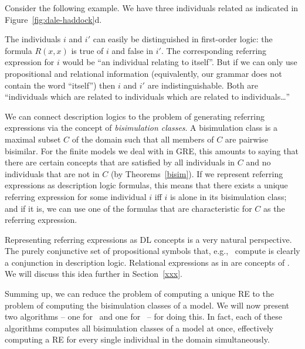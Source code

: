 Consider the following example.  We have three individuals related as indicated in
Figure~\ref{fig:dale-haddock}d.

%
The individuals $i$ and $i'$ can easily be distinguished in first-order logic:
the formula $R(x,x)$ is true of $i$ and false in $i'$. The corresponding
referring expression for $i$ would be ``an individual relating to itself''.
But if we can only use propositional and relational information (equivalently, our grammar does not contain the word ``itself'') then $i$ and $i'$ are indistinguishable. Both
are ``individuals which are related to individuals which are related to individuals\ldots''

We can connect description logics to the problem of generating
referring expressions via the concept of \emph{bisimulation classes}.
A bisimulation class is a maximal subset $C$ of the domain such that
all members of $C$ are pairwise bisimilar.  For the finite models we
deal with in GRE, this amounts to saying that there are certain
concepts that are satisfied by all individuals in $C$ and no
individuals that are not in $C$ (by Theorems~\ref{bisim}).  If we represent referring expressions as description logic formulas,
this means that there exists a unique referring expression for some
individual $i$ iff $i$ is alone in its bisimulation class; and if it
is, we can use one of the formulas that are characteristic for $C$ as
the referring expression.

Representing referring expressions as DL concepts is a very natural
perspective.  The purely conjunctive set of propositional symbols that,
e.g.,~ compute is clearly a conjunction in
description logic.  Relational expressions as in
 are concepts of \el.
We will discuss this idea further in Section~\ref{xxx}.

Summing up, we can reduce the problem of computing a unique RE
to the problem of computing the bisimulation classes of a model.  We
will now present two algorithms -- one for \alc\ and one for \el\ --
for doing this.  In fact, each of these algorithms computes all
bisimulation classes of a model at once, effectively computing a RE
for every single individual in the domain simultaneously.


